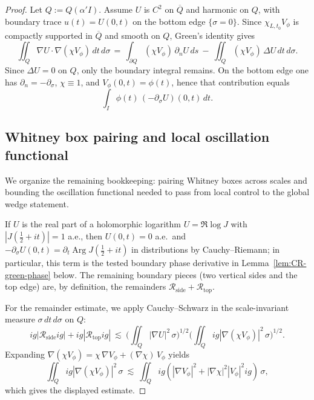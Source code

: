 \documentclass[11pt]{amsart}
\theoremstyle{definition}
\theoremstyle{remark}
\DeclareMathOperator{\Arg}{Arg}
\begin{document}
\begin{proof}
Let \(Q:=Q(\alpha'I)\).
Assume \(U\) is \(C^2\) on \(\overline Q\) and harmonic on \(Q\), with boundary trace \(u(t)=U(0,t)\) on the bottom edge \(\{\sigma=0\}\).
Since \(\chi_{L,t_0}V_\phi\) is compactly supported in \(\overline Q\) and smooth on \(Q\), Green's identity gives
\[
  \iint_{Q} \nabla U\cdot \nabla(\chi V_\phi)\,dt\,d\sigma
  \,=\,
  \int_{\partial Q} (\chi V_\phi)\,\partial_n U\,ds
  \ -\ \iint_{Q} (\chi V_\phi)\,\Delta U\,dt\,d\sigma.
\]
Since \(\Delta U=0\) on \(Q\), only the boundary integral remains.
On the bottom edge one has \(\partial_n=-\partial_\sigma\), \(\chi\equiv1\), and \(V_\phi(0,t)=\phi(t)\), hence that contribution equals
\[
  \int_{I} \phi(t)\,(-\partial_\sigma U)(0,t)\,dt.
\]
\subsection{Whitney box pairing and local oscillation functional}

\label{appA:whitney}

We organize the remaining bookkeeping: pairing Whitney boxes across scales and bounding the oscillation functional needed to pass from local control to the global wedge statement.

If \(U\) is the real part of a holomorphic logarithm \(U=\Re\log J\) with \(|J(\tfrac12+it)|=1\) a.e., then \(U(0,t)=0\) a.e.\ and \(-\partial_\sigma U(0,t)=\partial_t \Arg J(\tfrac12+it)\) in distributions by Cauchy--Riemann; in particular, this term is the tested boundary phase derivative in Lemma~\ref{lem:CR-green-phase} below.
The remaining boundary pieces (two vertical sides and the top edge) are, by definition, the remainders \(\mathcal R_{\mathrm{side}}+\mathcal R_{\mathrm{top}}\).

For the remainder estimate, we apply Cauchy--Schwarz in the scale-invariant measure \(\sigma\,dt\,d\sigma\) on \(Q\):
\[
  ig|\mathcal R_{\mathrm{side}}ig|+ig|\mathcal R_{\mathrm{top}}ig|
  \ \lesssim\ \Big(\iint_Q |\nabla U|^2\,\sigma\Big)^{1/2}
               \Big(\iint_Q ig|\nabla(\chi V_\phi)|^2\,\sigma\Big)^{1/2}.
\]
Expanding \(\nabla(\chi V_\phi)=\chi\,\nabla V_\phi + (\nabla\chi)\,V_\phi\) yields
\[
  \iint_Q ig|\nabla(\chi V_\phi)|^2\,\sigma
  \ \lesssim\ \iint_Q ig(|\nabla V_\phi|^2 + |\nabla\chi|^2|V_\phi|^2ig)\,\sigma,
\]
which gives the displayed estimate.
\end{proof}
\end{document}
